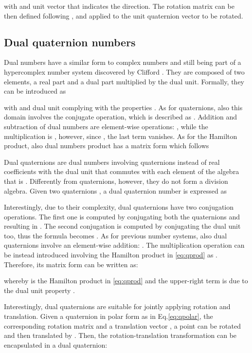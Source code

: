 \documentclass[3p, preprint, twocolumn]{elsarticle}
\begin{document}
\noindent with  and  unit vector that indicates the direction. The rotation matrix can be then defined following \cite{Kuipers1921book}, and applied to the unit quaternion vector to be rotated.


\subsection{Dual quaternion numbers}

Dual numbers have a similar form to complex numbers and still being part of a hypercomplex number system discovered by Clifford \cite{Clifford1871}. They are composed of two elements, a real part and a dual part multiplied by the dual unit. Formally, they can be introduced as



\noindent with  and  dual unit complying with the properties . As for quaternions, also this domain involves the conjugate operation, which is described as . Addition and subtraction of dual numbers are element-wise operations: , while the multiplication is , however, since , the last term vanishes. As for the Hamilton product, also dual numbers product has a matrix form which follows




Dual quaternions are dual numbers involving quaternions instead of real coefficients with the dual unit  that commutes with each element of the algebra that is . Differently from quaternions, however, they do not form a division algebra. Given two quaternions , a dual quaternion number is expressed as



Interestingly, due to their complexity, dual quaternions have two conjugation operations. The first one is computed by conjugating both the quaternions  and  resulting in . The second conjugation is computed by conjugating the dual unit too, thus the formula becomes . As for previous number systems, also dual quaternions involve an element-wise addition: . The multiplication operation can be instead introduced involving the Hamilton product in \eqref{eq:qprod} as . Therefore, its matrix form can be written as:



\noindent whereby  is the Hamilton product in \eqref{eq:qprod} and the upper-right term is  due to the dual unit property .

Interestingly, dual quaternions are suitable for jointly applying rotation and translation. Given a quaternion in polar form  as in Eq.\ref{eq:qpolar}, the corresponding rotation matrix  and a translation vector , a point  can be rotated and then translated by  \cite{CaoDual2021, Jia2018DualQ}. Then, the rotation-translation transformation can be encapsulated in a dual quaternion:
\end{document}
